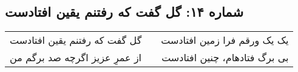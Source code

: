\begin{center}
\section*{شماره ۱۴: گل گفت که رفتنم یقین افتادست}
\label{sec:014}
\begin{longtable}{l p{0.5cm} r}
گل گفت که رفتنم یقین افتادست
&&
یک یک ورقم فرا زمین افتادست
\\
از عمرِ عزیز اگرچه صد برگم من
&&
بی برگ فتادهام، چنین افتادست
\\
\end{longtable}
\end{center}
